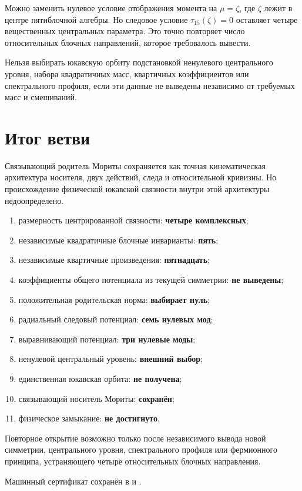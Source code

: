 Можно заменить нулевое условие отображения момента на
\(\mu=\zeta\), где \(\zeta\) лежит в центре пятиблочной алгебры. Но
следовое условие \(\tau_{15}(\zeta)=0\) оставляет четыре вещественных
центральных параметра. Это точно повторяет число относительных блочных
направлений, которое требовалось вывести.

\begin{nogocriterion}
Нельзя выбирать юкавскую орбиту подстановкой ненулевого центрального уровня,
набора квадратичных масс, квартичных коэффициентов или спектрального
профиля, если эти данные не выведены независимо от требуемых масс и
смешиваний.
\end{nogocriterion}

\section{Итог ветви}

Связывающий родитель Мориты сохраняется как точная кинематическая
архитектура носителя, двух действий, следа и относительной кривизны. Но
происхождение физической юкавской связности внутри этой архитектуры
недоопределено.

\begin{protocol}
\begin{enumerate}
 \item размерность центрированной связности: \textbf{четыре комплексных};
 \item независимые квадратичные блочные инварианты: \textbf{пять};
 \item независимые квартичные произведения: \textbf{пятнадцать};
 \item коэффициенты общего потенциала из текущей симметрии:
 \textbf{не выведены};
 \item положительная родительская норма: \textbf{выбирает нуль};
 \item радиальный следовый потенциал: \textbf{семь нулевых мод};
 \item выравнивающий потенциал: \textbf{три нулевые моды};
 \item ненулевой центральный уровень: \textbf{внешний выбор};
 \item единственная юкавская орбита: \textbf{не получена};
 \item связывающий носитель Мориты: \textbf{сохранён};
 \item физическое замыкание: \textbf{не достигнуто}.
\end{enumerate}
\end{protocol}

Повторное открытие возможно только после независимого вывода новой
симметрии, центрального уровня, спектрального профиля или фермионного
принципа, устраняющего четыре относительных блочных направления.

Машинный сертификат сохранён в
 и
.